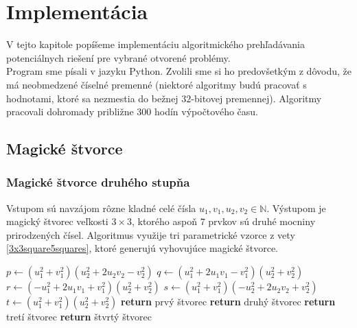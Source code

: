 \chapter{Implementácia}

\label{kap:implementation} %

V tejto kapitole popíšeme implementáciu algoritmického prehľadávania potenciálnych riešení pre vybrané otvorené problémy. \\

Program sme písali v jazyku Python. Zvolili sme si ho predovšetkým z dôvodu, že má neobmedzené číselné premenné (niektoré algoritmy budú pracovať s hodnotami, ktoré sa nezmestia do bežnej $32$-bitovej premennej). Algoritmy pracovali dohromady približne $300$ hodín výpočtového času.

\section{Magické štvorce}

\subsection{Magické štvorce druhého stupňa}

\begin{subalg} Vstupom sú navzájom rôzne kladné celé čísla $u_1, v_1, u_2, v_2 \in \mathbb{N}$. Výstupom je magický štvorec veľkosti $3 \times 3$, ktorého aspoň $7$ prvkov sú druhé mocniny prirodzených čísel. Algoritmus využije tri parametrické vzorce z vety \ref{3x3square5squares}, ktoré generujú vyhovujúce magické štvorce.
\end{subalg}

\begin{algorithmic}
\State $p \gets (u_1^2 + v_1^2)(u_2^2 + 2u_2 v_2 - v_2^2)$
\State $q \gets (u_1^2 + 2u_1 v_1 - v_1^2)(u_2^2 + v_2^2)$
\State $r \gets (- u_1^2 + 2u_1 v_1 + v_1^2)(u_2^2 + v_2^2)$
\State $s \gets (u_1^2 + v_1^2)(-u_2^2 + 2u_2 v_2 + v_2^2)$
\State $t \gets (u_1^2 + v_1^2)(u_2^2 + v_2^2)$
    \STATE \textbf{return} prvý štvorec
\ENDIF
{}
    \STATE \textbf{return} druhý štvorec
\ENDIF
{}
    \STATE \textbf{return} tretí štvorec
\ENDIF
{}
    \STATE \textbf{return} štvrtý štvorec
\ENDIF
\end{algorithmic}



